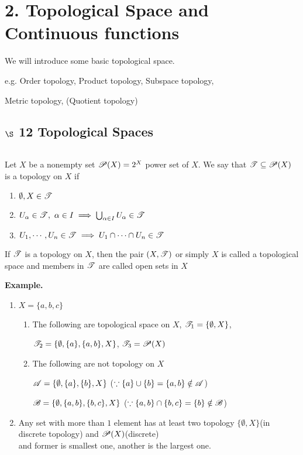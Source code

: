 \section*{2. Topological Space and Continuous functions}

We will introduce some basic topological space.

e.g. Order topology, Product topology, Subspace topology,

Metric topology, (Quotient topology)

\subsection*{$\S$ 12 Topological Spaces} $ $

\begin{defn}
	Let $X$ be a nonempty set $\P(X) = 2^X$ power set of $X$. We say that $\T \subseteq \P(X)$ is a topology on $X$ if
	
	\begin{enumerate}
		\item $\emptyset,X \in \T$
		\item $U_{\alpha} \in \T,~\alpha \in I \implies \bigcup_{\alpha \in I}U_{\alpha} \in \T$
		\item $U_1 , \cdots,U_n \in \T \implies U_1 \cap \cdots \cap U_n \in \T$
	\end{enumerate}
	
	If $\T$ is a topology on $X$, then the pair $(X,\T)$ or simply $X$ is called a topological space and members in $\T$ are called open sets in $X$
\end{defn}

\textbf{Example.}

\begin{enumerate}
\item $X = \{a,b,c\}$
		\begin{enumerate}
		\item The following are topological space on $X$, $\T_1 = \{\emptyset,X\}$,
			
			$\T_2 = \{\emptyset,\{a\},\{a,b\},X\}$, $\T_3 = \P(X)$
		\item The following are not topology on $X$
		
		$\A = \{\emptyset,\{a\},\{b\},X\}$ ($\because \{a\} \cup \{b\} = \{a,b\} \notin \A$)
		
		$\B = \{\emptyset,\{a,b\},\{b,c\},X\}$ ($\because \{a,b\} \cap \{b,c\} = \{b\} \notin \B$)
		\end{enumerate}
		\item Any set with more than $1$ element has at least two topology $\{\emptyset,X\}$(in discrete topology) and $\P(X)$(discrete)\\
		and former is smallest one, another is the largest one.
\end{enumerate}

